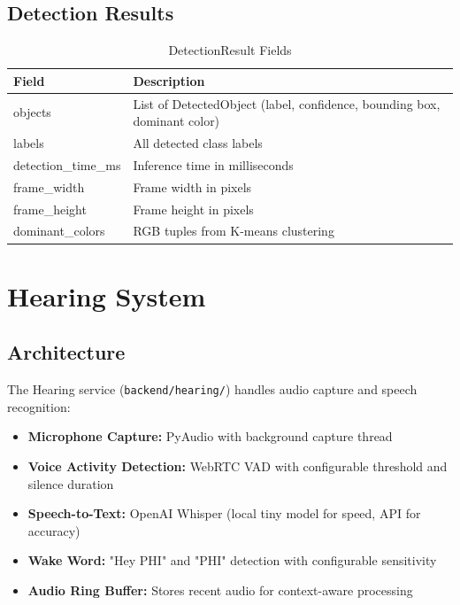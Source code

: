 \documentclass[12pt,a4paper,twoside]{report}
\begin{document}
\subsection{Detection Results}

\begin{table}[H]
\centering
{}
\begin{tabularx}{\textwidth}{|l|X|}
\hline
\rowcolor{phiblue!20}
\textbf{Field} & \textbf{Description} \\
\hline
objects & List of DetectedObject (label, confidence, bounding box, dominant color) \\
\hline
labels & All detected class labels \\
\hline
detection\_time\_ms & Inference time in milliseconds \\
\hline
frame\_width & Frame width in pixels \\
\hline
frame\_height & Frame height in pixels \\
\hline
dominant\_colors & RGB tuples from K-means clustering \\
\hline
\end{tabularx}
\caption{DetectionResult Fields}
\end{table}

\section{Hearing System}

\subsection{Architecture}

The Hearing service (\texttt{backend/hearing/}) handles audio capture and speech recognition:

\begin{itemize}
    \item \textbf{Microphone Capture:} PyAudio with background capture thread
    \item \textbf{Voice Activity Detection:} WebRTC VAD with configurable threshold and silence duration
    \item \textbf{Speech-to-Text:} OpenAI Whisper (local tiny model for speed, API for accuracy)
\item \textbf{Wake Word:} "Hey PHI" and "PHI" detection with
configurable sensitivity
    \item \textbf{Audio Ring Buffer:} Stores recent audio for context-aware processing
\end{itemize}
\end{document}
